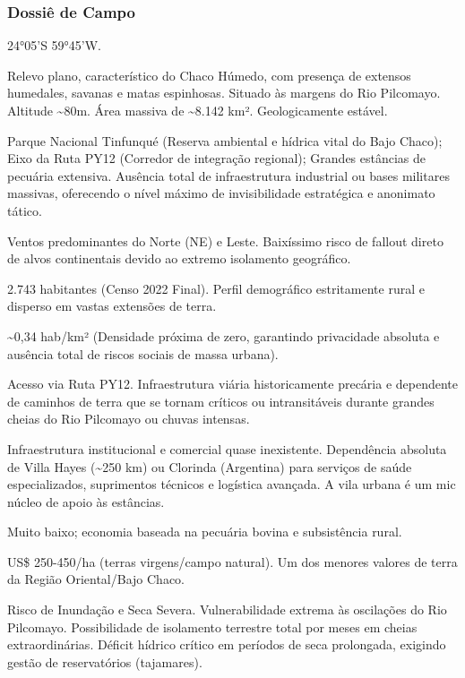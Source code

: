 \subsubsection{Dossiê de Campo}
\begin{description}[style=nextline,leftmargin=0.5cm,font=\bfseries]
\item[Coordenadas]  24°05'S 59°45'W.
\item[Topografia]  Relevo plano, característico do Chaco Húmedo, com presença de extensos humedales, savanas e matas espinhosas. Situado às margens do Rio Pilcomayo. Altitude \textasciitilde 80m. Área massiva de \textasciitilde 8.142 km². Geologicamente estável.
\item[Alvos Estratégicos]  Parque Nacional Tinfunqué (Reserva ambiental e hídrica vital do Bajo Chaco); Eixo da Ruta PY12 (Corredor de integração regional); Grandes estâncias de pecuária extensiva. Ausência total de infraestrutura industrial ou bases militares massivas, oferecendo o nível máximo de invisibilidade estratégica e anonimato tático.
\item[Fallout]  Ventos predominantes do Norte (NE) e Leste. Baixíssimo risco de fallout direto de alvos continentais devido ao extremo isolamento geográfico.
\item[População]  2.743 habitantes (Censo 2022 Final). Perfil demográfico estritamente rural e disperso em vastas extensões de terra.
\item[Densidade]  \textasciitilde 0,34 hab/\allowbreak km² (Densidade próxima de zero, garantindo privacidade absoluta e ausência total de riscos sociais de massa urbana).
\item[Vias de Acesso]  Acesso via Ruta PY12. Infraestrutura viária historicamente precária e dependente de caminhos de terra que se tornam críticos ou intransitáveis durante grandes cheias do Rio Pilcomayo ou chuvas intensas.
\item[Serviços]  Infraestrutura institucional e comercial quase inexistente. Dependência absoluta de Villa Hayes (\textasciitilde 250 km) ou Clorinda (Argentina) para serviços de saúde especializados, suprimentos técnicos e logística avançada. A vila urbana é um mic núcleo de apoio às estâncias.
\item[Custo de Vida]  Muito baixo; economia baseada na pecuária bovina e subsistência rural.
\item[Preço da Terra]  US\$ 250-450/\allowbreak ha (terras virgens/\allowbreak campo natural). Um dos menores valores de terra da Região Oriental/\allowbreak Bajo Chaco.
\item[Hidrologia]  Risco de Inundação e Seca Severa. Vulnerabilidade extrema às oscilações do Rio Pilcomayo. Possibilidade de isolamento terrestre total por meses em cheias extraordinárias. Déficit hídrico crítico em períodos de seca prolongada, exigindo gestão de reservatórios (tajamares).

\end{description}
